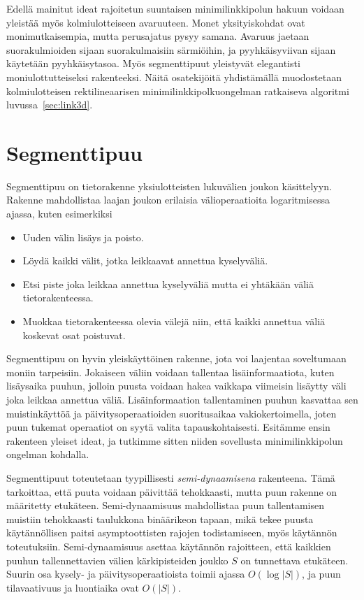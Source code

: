 \documentclass[finnish]{tktltiki2}
\theoremstyle{definition}
\theoremstyle{remark}
\newcommand\size[1]{\ensuremath{\left |#1\right |}\xspace}
\newcommand\epts{\ensuremath{S}\xspace}
\begin{document}
Edellä mainitut ideat rajoitetun suuntaisen minimilinkkipolun hakuun voidaan yleistää myös kolmiulotteiseen avaruuteen.
Monet yksityiskohdat ovat monimutkaisempia, mutta perusajatus pysyy samana.
Avaruus jaetaan suorakulmioiden sijaan suorakulmaisiin särmiöihin, ja pyyhkäisyviivan sijaan käytetään pyyhkäisytasoa.
Myös segmenttipuut yleistyvät elegantisti moniulottutteiseksi rakenteeksi.
Näitä osatekijöitä yhdistämällä muodostetaan kolmiulotteisen rektilineaarisen minimilinkkipolkuongelman ratkaiseva algoritmi luvussa~\ref{sec:link3d}.



\section{Segmenttipuu}\label{sec:segtree}

Segmenttipuu on tietorakenne yksiulotteisten lukuvälien joukon käsittelyyn.
Rakenne mahdollistaa laajan joukon erilaisia välioperaatioita logaritmisessa ajassa, kuten esimerkiksi
\begin{itemize}
	\item Uuden välin lisäys ja poisto.
	\item Löydä kaikki välit, jotka leikkaavat annettua kyselyväliä.
	\item Etsi piste joka leikkaa annettua kyselyväliä mutta ei yhtäkään väliä tietorakenteessa.
	\item Muokkaa tietorakenteessa olevia välejä niin, että kaikki annettua väliä koskevat osat poistuvat.
\end{itemize}

Segmenttipuu on hyvin yleiskäyttöinen rakenne, jota voi laajentaa soveltumaan moniin tarpeisiin.
Jokaiseen väliin voidaan tallentaa lisäinformaatiota, kuten lisäysaika puuhun, jolloin puusta voidaan hakea vaikkapa viimeisin lisäytty väli joka leikkaa annettua väliä.
Lisäinformaation tallentaminen puuhun kasvattaa sen muistinkäyttöä ja päivitysoperaatioiden suoritusaikaa vakiokertoimella, joten puun tukemat operaatiot on syytä valita tapauskohtaisesti.
Esitämme ensin rakenteen yleiset ideat, ja tutkimme sitten niiden sovellusta minimilinkkipolun ongelman kohdalla.

Segmenttipuut toteutetaan tyypillisesti \emph{semi-dynaamisena} rakenteena.
Tämä tarkoittaa, että puuta voidaan päivittää tehokkaasti, mutta puun rakenne on määritetty etukäteen.
Semi-dynaamisuus mahdollistaa puun tallentamisen muistiin tehokkaasti taulukkona binäärikeon tapaan, mikä tekee puusta käytännöllisen paitsi asymptoottisten rajojen todistamiseen, myös käytännön toteutuksiin.
Semi-dynaamisuus asettaa käytännön rajoitteen, että kaikkien puuhun tallennettavien välien kärkipisteiden joukko \epts on tunnettava etukäteen.
Suurin osa kysely- ja päivitysoperaatioista toimii ajassa $O(\log \size{\epts})$, ja puun tilavaativuus ja luontiaika ovat $O(\size{\epts})$.
\end{document}
